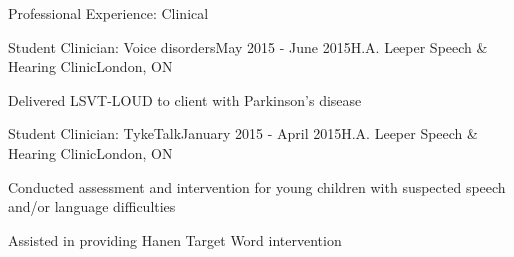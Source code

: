 \documentclass{resume} %
\begin{document}
\begin{rSection}{Professional Experience: Clinical}
	
	\begin{rSubsection}{Student Clinician: Voice disorders}{May 2015 - June 2015}{H.A. Leeper Speech \& Hearing Clinic}{London, ON}
	\item Delivered LSVT-LOUD to client with Parkinson's disease
	\end{rSubsection}
	
	
	\begin{rSubsection}{Student Clinician: TykeTalk}{January 2015 - April 2015}{H.A. Leeper Speech \& Hearing Clinic}{London, ON}
	\item Conducted assessment and intervention for young children with suspected speech and/or language difficulties
	\item Assisted in providing Hanen Target Word intervention
	\end{rSubsection}
\end{rSection}
\end{document}
